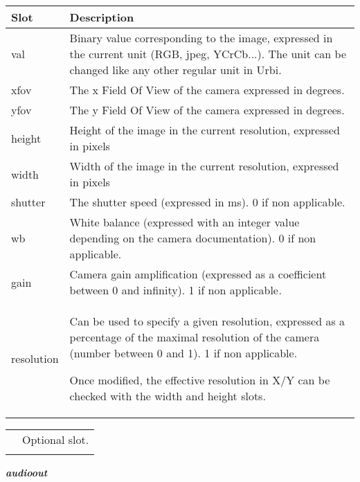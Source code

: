 \documentclass[a4paper]{article}
\begin{document}
\begin{flushleft}
\tablehead{}
\begin{supertabular}{|m{3.293cm}|m{11.997cm}|}
\hline
{}\sffamily\bfseries Slot &
\sffamily\bfseries Description\\\hline
{} val &
\sffamily Binary value corresponding to the
image, expressed in the current unit (RGB, jpeg, YCrCb...). The unit
can be changed like any other regular unit in Urbi. \\\hline
{} xfov &
\sffamily The x Field Of View of the camera
expressed in degrees.\\\hline
{} yfov &
\sffamily The y Field Of View of the camera
expressed in degrees.\\\hline
{} height &
\sffamily Height of the image in the current
resolution, expressed in pixels\\\hline
{} width &
\sffamily Width of the image in the current
resolution, expressed in pixels\\\hline
{} shutter &
 \textsf{The shutter speed }\textsf{(expressed
in ms). 0 if non applicable.}\\\hline
{} wb &
 \textsf{White balance }\textsf{(expressed with
an integer value depending on the camera documentation). 0 if non
applicable.}\\\hline
{} gain &
 \textsf{Camera gain amplification
}\textsf{(expressed as a coefficient between 0 and infinity). 1 if non
applicable}\textsf{\textit{.}}\\\hline
{} resolution &
{\sffamily Can be used to specify a given
resolution, expressed as a percentage of the maximal resolution of the
camera (number between 0 and 1). 1 if non applicable. }

\sffamily Once modified, the effective
resolution in X/Y can be checked with the width and height
slots.\\\hline
\end{supertabular}
\end{flushleft}
\begin{flushleft}
\tablehead{}
\begin{supertabular}{|m{1.717cm}|m{10.464cm}}
\hhline{-~}
 &
 Optional slot.\\\hhline{-~}
\end{supertabular}
\end{flushleft}
{\sffamily\bfseries\itshape
audioout}
\end{document}
